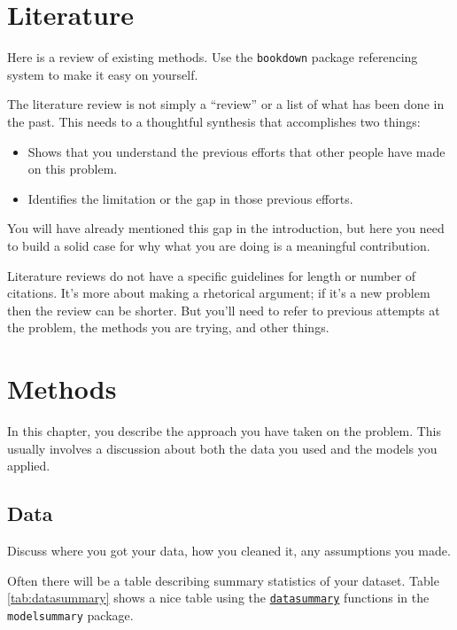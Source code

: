 \documentclass[3p, authoryear]{elsarticle} %
\providecommand{\tightlist}{%
  \setlength{\itemsep}{0pt}\setlength{\parskip}{0pt}}
\begin{document}
\hypertarget{literature}{%
\section{Literature}\label{literature}}

Here is a review of existing methods. Use the \texttt{bookdown} \citep{xie2015} package
referencing system to make it easy on yourself.

The literature review is not simply a ``review'' or a list of what has been
done in the past. This needs to a thoughtful synthesis that accomplishes two
things:

\begin{itemize}
\tightlist
\item
  Shows that you understand the previous efforts that other people have
  made on this problem.
\item
  Identifies the limitation or the gap in those previous efforts.
\end{itemize}

You will have already mentioned this gap in the introduction, but here you need
to build a solid case for why what you are doing is a meaningful contribution.

Literature reviews do not have a specific guidelines for length or number of
citations. It's more about making a rhetorical argument; if it's a new problem
then the review can be shorter. But you'll need to refer to previous attempts at
the problem, the methods you are trying, and other things.

\hypertarget{methods}{%
\section{Methods}\label{methods}}

In this chapter, you describe the approach you have taken on the problem. This
usually involves a discussion about both the data you used and the models you
applied.

\hypertarget{data}{%
\subsection{Data}\label{data}}

Discuss where you got your data, how you cleaned it, any assumptions you made.

Often there will be a table describing summary statistics of your dataset.
Table \ref{tab:datasummary} shows a nice table using the \href{https://vincentarelbundock.github.io/modelsummary/articles/datasummary.html}{\texttt{datasummary}}
functions in the \texttt{modelsummary} package.
\end{document}
